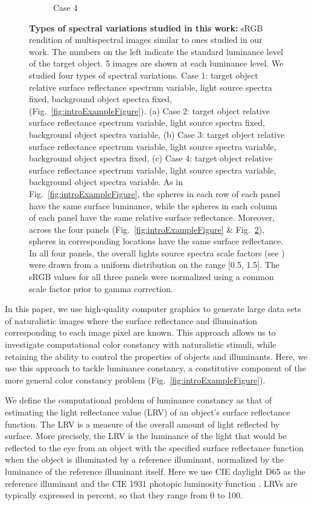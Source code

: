 \documentclass{jov}
\begin{document}
\begin{figure}
\begin{subfigure}[b]{0.33 \textwidth}
        \caption{Case 4}
        \label{fig:allSpectraVarying}
    \end{subfigure}    
    \caption{{\bf Types of spectral variations studied in this work:} sRGB rendition of multispectral images similar to ones studied in our work. The numbers on the left indicate the standard luminance level of the target object. 5 images are shown at each luminance level. We studied four types of spectral variations. Case 1: target object relative surface reflectance spectrum variable, light source spectra fixed, background object spectra fixed, (Fig.~\ref{fig:introExampleFigure}). (a) Case 2: target object relative surface reflectance spectrum variable, light source spectra fixed, background object spectra variable, (b) Case 3: target object relative surface reflectance spectrum variable, light source spectra variable, background object spectra fixed, (c) Case 4: target object relative surface reflectance spectrum variable, light source spectra variable, background object spectra variable. As in Fig.~\ref{fig:introExampleFigure}, the spheres in each row of each panel have the same surface luminance, while the spheres in each column of each panel have the same relative surface reflectance.  Moreover, across the four panels (Fig.~\ref{fig:introExampleFigure} \& Fig.~\ref{fig:studiedCases}), spheres in corresponding locations have the same surface reflectance. In all four panels, the overall lights source spectra scale factors (see ) were drawn from a uniform distribution on the range [0.5, 1.5]. The sRGB values for all three panels were normalized using a common scale factor prior to gamma correction.} 
\label{fig:studiedCases}
\end{figure}

In this paper, we use high-quality computer graphics to generate large data sets of naturalistic images where the surface reflectance and illumination corresponding to each image pixel are known. 
This approach allows us to investigate computational color constancy with naturalistic stimuli, while retaining the ability to control the properties of objects and illuminants. Here, we use this approach to tackle luminance constancy, a constitutive component of the more general color constancy problem (Fig.~\ref{fig:introExampleFigure}). 

We define the computational problem of luminance constancy as that of estimating the light reflectance value (LRV) of an object's surface reflectance function.
The LRV is a measure of the overall amount of light reflected by surface.
More precisely, the LRV is the luminance of the light that would
be reflected to the eye from an object with the specified surface reflectance function when the object is illuminated by a reference illuminant,
normalized by the luminance of the reference illuminant itself.
Here we use CIE daylight D65 as the reference illuminant and the CIE 1931 photopic luminosity function \cite{CIE86}.
LRVs are typically expressed in percent, so that they range from 0 to 100.
\end{document}
